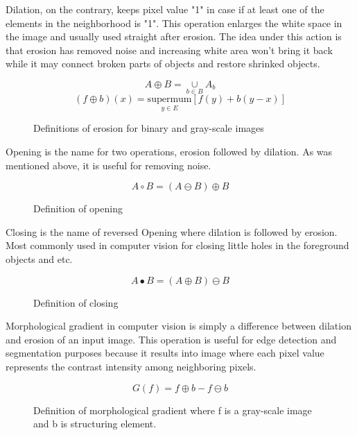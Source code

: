 \documentclass[../../../../main]{subfiles}
\begin{document}
Dilation, on the contrary, keeps pixel value "1" in case if at least one of the elements in the neighborhood is "1". This operation enlarges the white space in the image and usually used straight after erosion. The idea under this action is that erosion has removed noise and increasing white area won't bring it back while it may connect broken parts of objects and restore shrinked objects. 

\begin{figure} [!ht]
  \centering    
    \begin{equation}
        A \oplus B = \underset{b\in B}{\cup} A_b
    \end{equation}
    \begin{equation}
       (f \oplus b)(x) = \underset{y\in E}{\text{supermum}}[f(y)+b(y-x)]
    \end{equation}
  \caption{Definitions of erosion for binary and gray-scale images}
\end{figure}

Opening is the name for two operations, erosion followed by dilation. As was mentioned above, it is useful for removing noise.

\begin{figure} [!ht]
  \centering    
    \begin{equation}
        A \circ B = (A \ominus B) \oplus B
    \end{equation}
  \caption{Definition of opening}
\end{figure}

Closing is the name of reversed Opening where dilation is followed by erosion. Most commonly used in computer vision for closing little holes in the foreground objects and etc.

\begin{figure} [!ht]
  \centering    
    \begin{equation}
        A \bullet B = (A \oplus B) \ominus B
    \end{equation}
  \caption{Definition of closing}
\end{figure}

Morphological gradient in computer vision is simply a difference between dilation and erosion of an input image. This operation is useful for edge detection and segmentation purposes because it results into image where each pixel value represents the contrast intensity among neighboring pixels.

\begin{figure} [!ht]
  \centering    
    \begin{equation}
        G(f) = f \oplus b - f \ominus b
    \end{equation}
  \caption{Definition of morphological gradient where f is a gray-scale image and b is structuring element.}
\end{figure}
\end{document}

